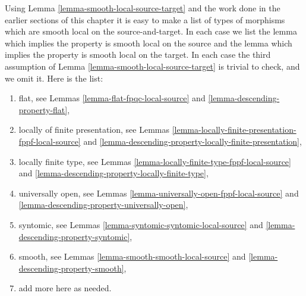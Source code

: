 \begin{remark}
\label{remark-list-local-source-target}
Using
Lemma \ref{lemma-smooth-local-source-target}
and the work done in the earlier sections of this chapter it is easy
to make a list of types of morphisms which are smooth local on the
source-and-target. In each case we list the lemma which implies
the property is smooth local on the source and the lemma which implies
the property is smooth local on the target. In each case the third assumption
of
Lemma \ref{lemma-smooth-local-source-target}
is trivial to check, and we omit it. Here is the list:
\begin{enumerate}
\item flat, see
Lemmas \ref{lemma-flat-fpqc-local-source} and
\ref{lemma-descending-property-flat},
\item locally of finite presentation, see
Lemmas \ref{lemma-locally-finite-presentation-fppf-local-source} and
\ref{lemma-descending-property-locally-finite-presentation},
\item locally finite type, see
Lemmas \ref{lemma-locally-finite-type-fppf-local-source} and
\ref{lemma-descending-property-locally-finite-type},
\item universally open, see
Lemmas \ref{lemma-universally-open-fppf-local-source} and
\ref{lemma-descending-property-universally-open},
\item syntomic, see
Lemmas \ref{lemma-syntomic-syntomic-local-source} and
\ref{lemma-descending-property-syntomic},
\item smooth, see
Lemmas \ref{lemma-smooth-smooth-local-source} and
\ref{lemma-descending-property-smooth},
\item add more here as needed.
\end{enumerate}
\end{remark}




















